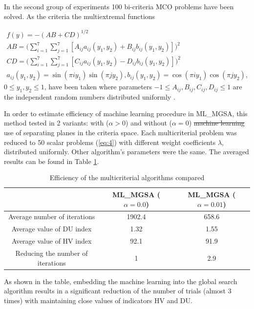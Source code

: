 \documentclass[runningheads]{llncs}
\begin{document}
In the second group of experiments 100 bi-criteria MCO problems have been solved. As the criteria the multiextremal functions

\begin{equation}
\begin{matrix}
f(y) = - (AB + CD)^{1/2} \\
AB = \Big(\sum_{i=1}^7 \sum_{j=1}^7 [A_{ij} a_{ij}(y_1, y_2) + B_{ij} b_{ij}(y_1, y_2)]\Big)^2 \\
CD = \Big(\sum_{i=1}^7 \sum_{j=1}^7 [C_{ij} a_{ij}(y_1, y_2) - D_{ij} b_{ij}(y_1, y_2)]\Big)^2 \\ 
a_{ij}(y_1, y_2) = \sin(\pi i y_1) \sin(\pi j y_2), b_{ij}(y_1, y_2) = \cos(\pi i y_1) \cos(\pi j y_2),
\end{matrix}
\end{equation}
$0 \leq y_1,y_2 \leq 1$, have been taken where parameters $-1 \leq A_{ij},B_{ij},C_{ij},D_{ij} \leq 1$ are the independent random numbers distributed uniformly \cite{Gergel2019_2,Grishagin2015_2}.

In order to estimate efficiency of machine learning procedure in ML\_MGSA, this method tested in 2 variants: with ($\alpha>0$) and without ($\alpha=0$)
\sout{machine learning} \textcolor[rgb]{1,0,0}{use of separating planes in the criteria space}. 
Each multicriterial problem was reduced to 50 scalar problems (\ref{eq:4}) with different weight coefficients $\lambda$, distributed uniformly. Other algorithm's parameters were the same. The averaged results can be found in Table \ref{tab:2}.

\begin{table}
\caption{Efficiency of the multicriterial algorithms compared}
\label{tab:2}
\begin{tabular}{ccc}
\hline
                                  & ML\_MGSA ($\alpha=0.0$) & ML\_MGSA ($\alpha=0.01$) \\ \hline
Average number of iterations      & 1902.4           & 658.6             \\
Average value of  DU index        & 1.32             & 1.55              \\
Average value of HV index         & 92.1             & 91.9              \\
Reducing the number of iterations & 1                & 2.9     \\  \hline        
\end{tabular}
\end{table}

As shown in the table, embedding the machine learning into the global search algorithm results in a significant reduction of the number of trials (almost 3 times) with maintaining close values of indicators HV and DU.

%
%
%
% 
% 
%


\end{document}
